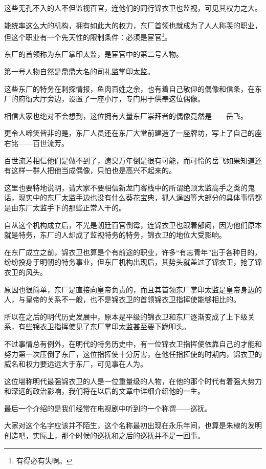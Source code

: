 \begin{multicols}{\theparacolNo}
这些无孔不入的人不但监视百官，连他们的同行锦衣卫也监视，可见其权力之大。

能统率这么大的机构，拥有如此大的权力，东厂首领也就成为了人人称羡的职业，但这个职业有一个先天性的限制条件：必须是宦官\footnote{有得必有失啊。}。

东厂的首领称为东厂掌印太监，是宦官中的第二号人物。

第一号人物自然是鼎鼎大名的司礼监掌印太监。

这些东厂的特务在刺探情报，鱼肉百姓之余，也有着自己敬仰的偶像和信条，在东厂的府衙大厅旁边，设置了一座小厅，专门用于供奉这位偶像。

相信大家也绝对不会想到，这位拥有大量东厂崇拜者的偶像竟然是——岳飞。

更令人啼笑皆非的是，东厂人员还在东厂大堂前建造了一座牌坊，写上了自己的座右铭——百世流芳。

百世流芳相信他们是做不到了，遗臭万年倒是很有可能，而可怜的岳飞如果知道还有这样一群人把他当成偶像，只怕也是高兴不起来的。

这里也要特地说明，请大家不要相信新龙门客栈中的所谓绝顶太监高手之类的鬼话，现实中的东厂太监手边也没有什么葵花宝典，抓人逞凶等大部分的具体事情都是由东厂太监手下的那些正常人干的。

自从这个机构成立后，不光是朝廷百官倒霉，连锦衣卫也跟着郁闷，因为他们原本就是特务，东厂的人却成了监视特务的特务，锦衣卫的地位大受影响。

在东厂成立之前，锦衣卫也算是个有前途的职业，许多“有志青年”出于各种目的，纷纷投身于明朝的特务事业，但东厂机构出现后，其势头就盖过了锦衣卫，抢了锦衣卫的风头。

原因也很简单，东厂是直接向皇帝负责的，而且其首领东厂掌印太监是皇帝身边的人，与皇帝的关系不一般，也不是锦衣卫的首领锦衣卫指挥使能够相比的。

所以在之后的明代历史发展中，原本是平级的锦衣卫和东厂逐渐变成了上下级关系，有些锦衣卫指挥使见了东厂掌印太监甚至要下跪叩头。

不过事情总有例外，在明代的特务历史中，有一位锦衣卫指挥使依靠自己的才能和努力第一次压倒了东厂，这位指挥使十分厉害，在他任指挥使的时期内，锦衣卫的威名和权力要远远大于东厂，可见事在人为。

这位堪称明代最强锦衣卫的人是一位重量级的人物，在他的那个时代有着强大势力和深远的政治影响，我们将在以后的文章中详细介绍他的一生。

最后一个介绍的是我们经常在电视剧中听到的一个称谓——巡抚。

大家对这个名字应该并不陌生，这个名称最初出现在永乐年间，也算是朱棣的发明创造吧，实际上，那个时候的巡抚和之后的巡抚并不是一回事。


\end{multicols}

